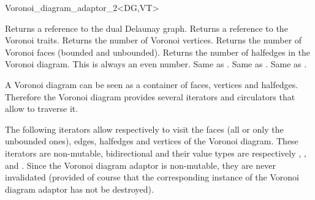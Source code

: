 \begin{ccRefClass}{Voronoi_diagram_adaptor_2<DG,VT>}

\ccCreation
{}
\ccThreeToTwo
%
%


\ccAccessFunctions
%
%
{Returns a reference to the dual Delaunay graph.}
\ccGlue
{}
{Returns a reference to the Voronoi traits.}
\ccGlue
{}
{Returns the number of Voronoi vertices.}
\ccGlue
{}
{Returns the number of Voronoi faces (bounded and unbounded).}
\ccGlue
{}
{Returns the number of halfedges in the Voronoi diagram. This is
  always an even number.}
\ccGlue
{}
{Same as .}
\ccGlue
{}
{Same as .}
\ccGlue
{}
{Same as .}
\ccGlue
{}
%
\ccGlue
{}





A Voronoi diagram can be seen as a container of faces, vertices and
halfedges. Therefore the Voronoi diagram provides several iterators
and circulators that allow to traverse it.





The following iterators allow respectively to visit the faces (all or
only the unbounded ones), edges, halfedges and vertices of the Voronoi
diagram. These iterators are non-mutable, bidirectional and their
value types are respectively , ,
 and .
Since the Voronoi diagram adaptor is non-mutable, they are never
invalidated (provided of course that the corresponding instance of the
Voronoi diagram adaptor has not be destroyed).


\end{ccRefClass}
